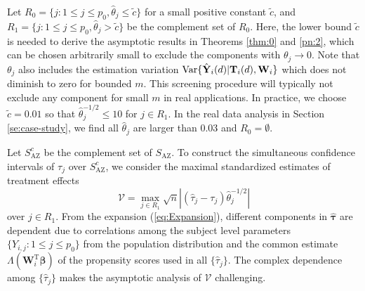 \documentclass[12pt]{article}
\def\be{\begin{equation}}
\def\ee{\end{equation}}
\def\T{{ \mathrm{\scriptscriptstyle T} }}
\def\AZ{{ \mathrm{\scriptscriptstyle AZ} }}
\theoremstyle{definition}
\newcommand{\V}{\rm Var}
\newcommand{\bT}{{\mathbf T}}
\newcommand{\bW}{{\mathbf W}}
\newcommand{\bY}{{\mathbf Y}}
\newcommand{\bbeta}  {\boldsymbol{\beta}}
\newcommand{\btau}{\boldsymbol{\tau}}
\begin{document}
Let $R_{0} = \{j: 1 \leq j \leq p_{0},
\hat{\theta}_j \leq \tilde{c} \}$ for a small positive constant $\tilde{c}$,
and $R_{1} = \{j: 1 \leq j \leq p_{0}, \hat{\theta}_j > \tilde{c}\}$ 
be the complement set of $R_{0}$. 
Here, the lower bound $\tilde{c}$ is needed to derive the asymptotic results in Theorems \ref{thm:0} and \ref{pn:2},
which can be chosen arbitrarily small to exclude the components with $\theta_j \to 0$.
Note that $\theta_j$ also includes the estimation variation ${\V}\{\hat{\bY}_{i}(d) | \bT_i(d), \bW_i\}$ which does not diminish to zero for bounded $m$. This screening procedure will typically not exclude any component for small $m$ in real applications.
In practice, we choose $\tilde{c} = 0.01$ so that $\hat{\theta}_j^{-1/2} \leq 10$ for $j \in R_1$.
In the real data analysis in Section \ref{se:case-study}, we find all $\hat{\theta}_j$ are larger than 0.03 and $R_0 = \emptyset$.

Let $S_{\AZ}^{c}$ be the complement set of $S_{\AZ}$. 
To construct the simultaneous confidence intervals of $\tau_j$ over $S_{\AZ}^{c}$, we consider the maximal standardized estimates of treatment effects
\be
\mathcal{V} = \max_{j \in R_1} \sqrt{n}| (\hat{\tau}_{j} - \tau_j) \hat{\theta}_{j}^{-1/2} |
\label{eq:maxtau2}\ee
over $j \in R_1$.
From the expansion (\ref{eq:Expansion}), 
different components in $\hat{\btau}$ are dependent due to correlations among the subject level parameters $\{Y_{i, j}: 1 \leq j \leq p_{0}\}$ from the population distribution and 
the common estimate $\Lambda(\bW_{i}^{\T}\hat{\bbeta})$ of
the propensity scores used in all $\{\hat{\tau}_j\}$.
The complex dependence among $\{\hat{\tau}_{j}\}$ makes the asymptotic analysis of $\mathcal{V}$ challenging.
\end{document}
